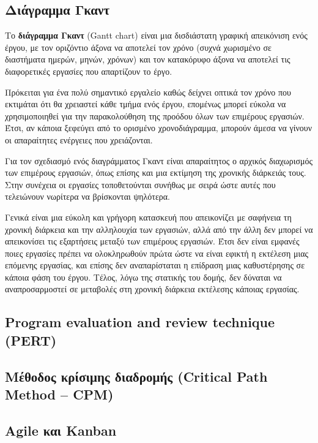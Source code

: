         \subsection{Διάγραμμα Γκαντ}
            Το \textbf{διάγραμμα Γκαντ} (Gantt chart) είναι μια δισδιάστατη γραφική απεικόνιση ενός έργου, με τον οριζόντιο άξονα να αποτελεί τον χρόνο (συχνά χωρισμένο σε διαστήματα ημερών, μηνών, χρόνων) και τον κατακόρυφο άξονα να αποτελεί τις διαφορετικές εργασίες που απαρτίζουν το έργο.

            Πρόκειται για ένα πολύ σημαντικό εργαλείο καθώς δείχνει οπτικά τον χρόνο που εκτιμάται ότι θα χρειαστεί κάθε τμήμα ενός έργου, επομένως μπορεί εύκολα να χρησιμοποιηθεί για την παρακολούθηση της προόδου όλων των επιμέρους εργασιών. Έτσι, αν κάποια ξεφεύγει από το ορισμένο χρονοδιάγραμμα, μπορούν άμεσα να γίνουν οι απαραίτητες ενέργειες που χρειάζονται. \cite{Xenos}

            Για τον σχεδιασμό ενός διαγράμματος Γκαντ είναι απαραίτητος ο αρχικός διαχωρισμός των επιμέρους εργασιών, όπως επίσης και μια εκτίμηση της χρονικής διάρκειάς τους. Στην συνέχεια οι εργασίες τοποθετούνται συνήθως με σειρά ώστε αυτές που τελειώνουν νωρίτερα να βρίσκονται ψηλότερα.
            
            Γενικά είναι μια εύκολη και γρήγορη κατασκευή που απεικονίζει με σαφήνεια τη χρονική διάρκεια και την αλληλουχία των εργασιών, αλλά από την άλλη δεν μπορεί να απεικονίσει τις εξαρτήσεις μεταξύ των επιμέρους εργασιών. Έτσι δεν είναι εμφανές ποιες εργασίες πρέπει να ολοκληρωθούν πρώτα ώστε να είναι εφικτή η εκτέλεση μιας επόμενης εργασίας, και επίσης δεν αναπαρίσταται η επίδραση μιας καθυστέρησης σε κάποια φάση του έργου. Τέλος, λόγω της στατικής του δομής, δεν δύναται να αναπροσαρμοστεί σε μεταβολές στη χρονική διάρκεια εκτέλεσης κάποιας εργασίας.

        \subsection{Program evaluation and review technique (PERT)}


        \subsection{Μέθοδος κρίσιμης διαδρομής (Critical Path Method -- CPM)}


        \subsection{Agile και Kanban}


